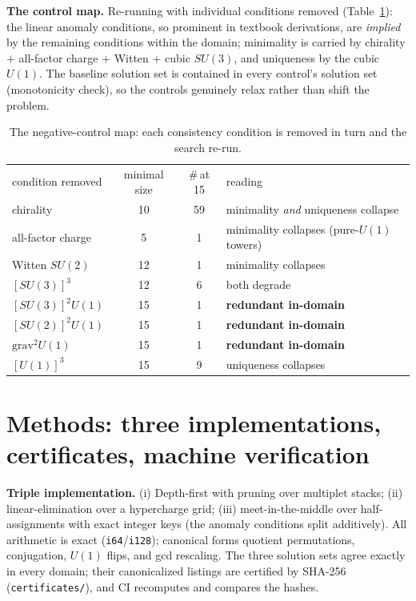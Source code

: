 \documentclass[aps,prd,preprint,nofootinbib]{revtex4-2}
\begin{document}
\textbf{The control map.} Re-running with individual conditions removed
(Table~\ref{tab:controls}): the linear anomaly conditions, so prominent in
textbook derivations, are \emph{implied} by the remaining conditions within the
domain; minimality is carried by chirality $+$ all-factor charge $+$ Witten $+$
cubic $SU(3)$, and uniqueness by the cubic $U(1)$. The baseline solution set is
contained in every control's solution set (monotonicity check), so the controls
genuinely relax rather than shift the problem.

\begin{table}[t]
\caption{\label{tab:controls}The negative-control map: each consistency
condition is removed in turn and the search re-run.}
\begin{ruledtabular}
\begin{tabular}{lccl}
condition removed & minimal size & \#\,at 15 & reading \\
\colrule
chirality           & 10 & 59 & minimality \emph{and} uniqueness collapse \\
all-factor charge   & 5  & 1  & minimality collapses (pure-$U(1)$ towers) \\
Witten $SU(2)$      & 12 & 1  & minimality collapses \\
$[SU(3)]^3$         & 12 & 6  & both degrade \\
$[SU(3)]^2U(1)$     & 15 & 1  & \textbf{redundant in-domain} \\
$[SU(2)]^2U(1)$     & 15 & 1  & \textbf{redundant in-domain} \\
$\mathrm{grav}^2U(1)$ & 15 & 1 & \textbf{redundant in-domain} \\
$[U(1)]^3$          & 15 & 9  & uniqueness collapses \\
\end{tabular}
\end{ruledtabular}
\end{table}

\section{Methods: three implementations, certificates, machine verification}
\label{sec:methods}

\textbf{Triple implementation.} (i) Depth-first with pruning over multiplet
stacks; (ii) linear-elimination over a hypercharge grid; (iii)
meet-in-the-middle over half-assignments with exact integer keys (the anomaly
conditions split additively). All arithmetic is exact
(\texttt{i64}/\texttt{i128}); canonical forms quotient permutations,
conjugation, $U(1)$ flips, and gcd rescaling. The three solution sets agree
exactly in every domain; their canonicalized listings are certified by SHA-256
(\texttt{certificates/}), and CI recomputes and compares the hashes.
\end{document}
